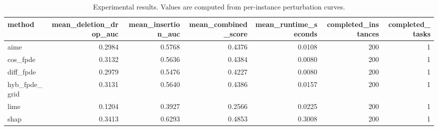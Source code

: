 \begin{table}[t]
\caption{Experimental results. Values are computed from per-instance perturbation curves.}
\label{tab:main_results_computed}
\centering
\begin{tabular}{lrrrrrr}
\toprule
method & mean\_deletion\_drop\_auc & mean\_insertion\_auc & mean\_combined\_score & mean\_runtime\_seconds & completed\_instances & completed\_tasks \\
\midrule
aime & 0.2984 & 0.5768 & 0.4376 & 0.0108 & 200 & 1 \\
cos\_fpde & 0.3132 & 0.5636 & 0.4384 & 0.0080 & 200 & 1 \\
diff\_fpde & 0.2979 & 0.5476 & 0.4227 & 0.0080 & 200 & 1 \\
hyb\_fpde\_grid & 0.3131 & 0.5640 & 0.4386 & 0.0157 & 200 & 1 \\
lime & 0.1204 & 0.3927 & 0.2566 & 0.0225 & 200 & 1 \\
shap & 0.3413 & 0.6293 & 0.4853 & 0.3008 & 200 & 1 \\
\bottomrule
\end{tabular}

\end{table}
